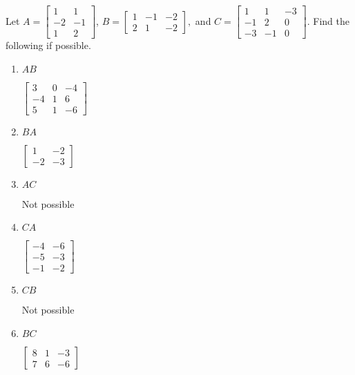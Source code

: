 \documentclass{ximera}
\begin{document}
\begin{problem}\label{prb:4.11} Let $A=\left[
\begin{array}{rr}
1 & 1 \\
-2 & -1 \\
1 & 2
\end{array}
\right] $, $B=\left[
\begin{array}{rrr}
1 & -1 & -2 \\
2 & 1 & -2
\end{array}
\right] ,$ and $C=\left[
\begin{array}{rrr}
1 & 1 & -3 \\
-1 & 2 & 0 \\
-3 & -1 & 0
\end{array}
\right] .$ Find the following if possible.

\begin{enumerate}
\item $AB$

\begin{hint}
$\left[
\begin{array}{rrr}
3 & 0 & -4 \\
-4 & 1 & 6 \\
5 & 1 & -6
\end{array}
\right] $
\end{hint}

\item $BA$

\begin{hint}
$\left[
\begin{array}{rr}
1 & -2 \\
-2 & -3
\end{array}
\right] $
\end{hint}

\item $AC$

\begin{hint}
Not possible
\end{hint}

\item $CA$

\begin{hint}
$\left[
\begin{array}{rr}
-4 & -6 \\
-5 & -3 \\
-1 & -2
\end{array}
\right] $
\end{hint}

\item $CB$

\begin{hint}
Not possible
\end{hint}

\item $BC$

\begin{hint}
$\left[
\begin{array}{rrr}
8 & 1 & -3 \\
7 & 6 & -6
\end{array}
\right] $
\end{hint}

\end{enumerate}
\end{problem}
\end{document}
